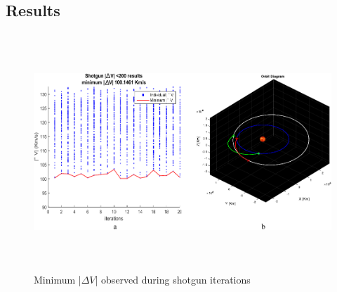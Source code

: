 \documentclass[11pt,a4paper]{article}
\begin{document}
\begin{multicols}{2}
\section{Results}\label{motivation}
\end{multicols}

\begin{figure}[H]
\centering
\includegraphics[height=3.5in]{images/shotgun.pdf}
\caption{Minimum |$\Delta V$| observed during shotgun iterations}
\end{figure}
\end{document}
